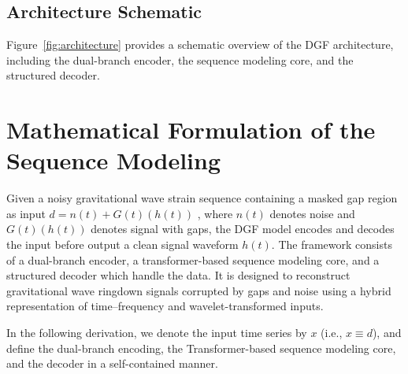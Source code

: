 \documentclass[prd,aps,a4paper,twocolumn,superscriptaddress,nofootinbib,floatfix]{revtex4-2}
\begin{document}
\subsection{Architecture Schematic}
\label{app:arch_schematic}

Figure~\ref{fig:architecture} provides a schematic overview of the DGF architecture, including the dual-branch encoder, the sequence modeling core, and the structured decoder.



\section{Mathematical Formulation of the Sequence Modeling}
\label{app:sequence_modeling}

Given a noisy gravitational wave strain sequence containing a masked gap region as input $d=n(t)+G(t)(h(t))$ , where $n(t)$ denotes noise and $G(t)(h(t))$ denotes signal with gaps, the DGF model encodes and decodes the input before output a clean signal waveform $h(t)$. The  framework consists of a dual-branch encoder, a transformer-based sequence modeling core, and a structured decoder which handle the data. It is designed to reconstruct gravitational wave ringdown signals corrupted by gaps and noise using a hybrid representation of time--frequency and wavelet-transformed inputs.\mbox{\cite{Wang:2024waveformer}}

\noindent In the following derivation, we denote the input time series by $x$ (i.e., $x \equiv d$), and define the dual-branch encoding, the Transformer-based sequence modeling core, and the decoder in a self-contained manner.
\end{document}
